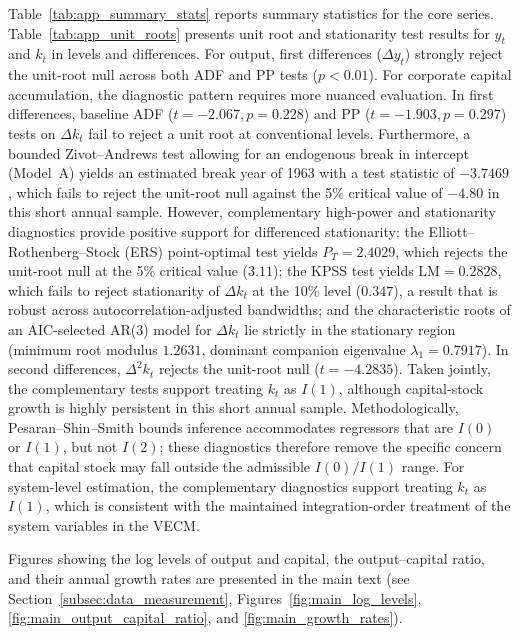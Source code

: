 Table~\ref{tab:app_summary_stats} reports summary statistics for the core series. Table~\ref{tab:app_unit_roots} presents unit root and stationarity test results for $y_t$ and $k_t$ in levels and differences. For output, first differences ($\Delta y_t$) strongly reject the unit-root null across both ADF and PP tests ($p < 0.01$). For corporate capital accumulation, the diagnostic pattern requires more nuanced evaluation. In first differences, baseline ADF ($t = -2.067, p = 0.228$) and PP ($t = -1.903, p = 0.297$) tests on $\Delta k_t$ fail to reject a unit root at conventional levels. Furthermore, a bounded Zivot--Andrews test allowing for an endogenous break in intercept (Model~A) yields an estimated break year of 1963 with a test statistic of $-3.7469$, which fails to reject the unit-root null against the 5\% critical value of $-4.80$ in this short annual sample. However, complementary high-power and stationarity diagnostics provide positive support for differenced stationarity: the Elliott--Rothenberg--Stock (ERS) point-optimal test yields $P_T = 2.4029$, which rejects the unit-root null at the 5\% critical value ($3.11$); the KPSS test yields $\text{LM} = 0.2828$, which fails to reject stationarity of $\Delta k_t$ at the 10\% level ($0.347$), a result that is robust across autocorrelation-adjusted bandwidths; and the characteristic roots of an AIC-selected AR(3) model for $\Delta k_t$ lie strictly in the stationary region (minimum root modulus $1.2631$, dominant companion eigenvalue $\lambda_1 = 0.7917$). In second differences, $\Delta^2 k_t$ rejects the unit-root null ($t = -4.2835$). Taken jointly, the complementary tests support treating $k_t$ as $I(1)$, although capital-stock growth is highly persistent in this short annual sample. Methodologically, Pesaran--Shin--Smith bounds inference accommodates regressors that are $I(0)$ or $I(1)$, but not $I(2)$; these diagnostics therefore remove the specific concern that capital stock may fall outside the admissible $I(0)/I(1)$ range. For system-level estimation, the complementary diagnostics support treating $k_t$ as $I(1)$, which is consistent with the maintained integration-order treatment of the system variables in the VECM.





Figures showing the log levels of output and capital, the output--capital ratio, and their annual growth rates are presented in the main text (see Section~\ref{subsec:data_measurement}, Figures~\ref{fig:main_log_levels}, \ref{fig:main_output_capital_ratio}, and \ref{fig:main_growth_rates}).

